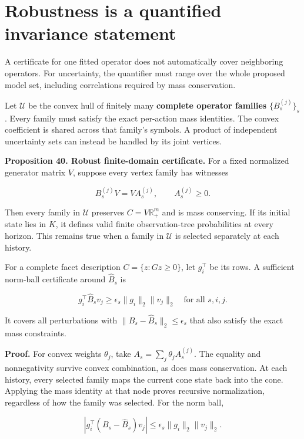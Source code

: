 \section{Robustness is a quantified invariance statement}\label{LSM:robustness-is-a-quantified-invariance-statement}

A certificate for one fitted operator does not automatically cover
neighboring operators. For uncertainty, the quantifier must range over
the whole proposed model set, including correlations required by mass
conservation.

Let \(\mathcal U\) be the convex hull of finitely many \textbf{complete
operator families} \(\{B_s^{(j)}\}_s\). Every family must satisfy the
exact per-action mass identities. The convex coefficient is shared
across that family's symbols. A product of independent uncertainty sets
can instead be handled by its joint vertices.

\textbf{Proposition 40. Robust finite-domain certificate.} For a fixed
normalized generator matrix \(V\), suppose every vertex family has
witnesses

\[
B_s^{(j)}V=VA_s^{(j)},\qquad A_s^{(j)}\geq0.
\]

Then every family in \(\mathcal U\) preserves \(C=V\mathbb R_+^m\) and
is mass conserving. If its initial state lies in \(K\), it defines valid
finite observation-tree probabilities at every horizon. This remains
true when a family in \(\mathcal U\) is selected separately at each
history.

For a complete facet description \(C=\{z:Gz\geq0\}\), let \(g_i^\top\)
be its rows. A sufficient norm-ball certificate around \(\widehat B_s\)
is

\[
\boxed{
 g_i^\top\widehat B_sv_j
 \geq\epsilon_s\|g_i\|_2\|v_j\|_2
 \quad\text{for all }s,i,j.
}
\]

It covers all perturbations with
\(\|B_s-\widehat B_s\|_2\leq\epsilon_s\) that also satisfy the exact
mass constraints.

\textbf{Proof.} For convex weights \(\theta_j\), take
\(A_s=\sum_j\theta_jA_s^{(j)}\). The equality and nonnegativity survive
convex combination, as does mass conservation. At each history, every
selected family maps the current cone state back into the cone. Applying
the mass identity at that node proves recursive normalization,
regardless of how the family was selected. For the norm ball,

\[
|g_i^\top(B_s-\widehat B_s)v_j|
\leq\epsilon_s\|g_i\|_2\|v_j\|_2.
\]

